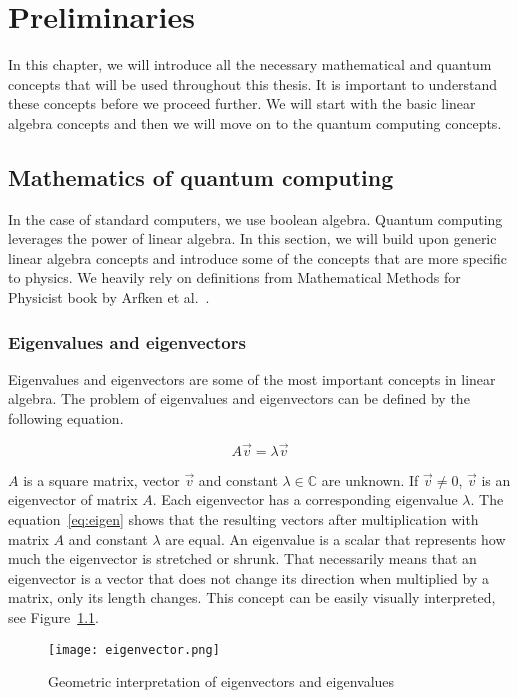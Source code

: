 \graphicspath{ {../images/}}

\chapter{Preliminaries}\label{ch:preliminaries}
In this chapter, we will introduce all the necessary mathematical and quantum concepts that will be used throughout this thesis. It is important to understand these concepts before we proceed further. We will start with the basic linear algebra concepts and then we will move on to the quantum computing concepts.
\section{Mathematics of quantum computing}
In the case of standard computers, we use boolean algebra. Quantum computing leverages the power of linear algebra. In this section, we will build upon generic linear algebra concepts and introduce some of the concepts that are more specific to physics. We heavily rely on definitions from Mathematical Methods for Physicist book by Arfken et al.~\cite{mmp}.

\subsection*{Eigenvalues and eigenvectors}
Eigenvalues and eigenvectors are some of the most important concepts in linear algebra. The problem of eigenvalues and eigenvectors can be defined by the following equation. 

\begin{equation}
  A\vec{v} = \lambda \vec{v}
  \label{eq:eigen}
\end{equation}

\noindent $A$ is a square matrix, vector $\vec{v}$ and constant $\lambda \in \mathbb{C}$ are unknown. If $\vec{v} \neq 0$, $\vec{v}$ is an eigenvector of matrix $A$. Each eigenvector has a corresponding eigenvalue $\lambda$. The equation~\ref{eq:eigen} shows that the resulting vectors after multiplication with matrix $A$ and constant $\lambda$ are equal. An eigenvalue is a scalar that represents how much the eigenvector is stretched or shrunk. That necessarily means that an eigenvector is a vector that does not change its direction when multiplied by a matrix, only its length changes. This concept can be easily visually interpreted, see Figure~\ref{fig:eigen}.

\begin{figure}[H]
  \centering
  \texttt{[image: eigenvector.png]}
  \caption{Geometric interpretation of eigenvectors and eigenvalues \cite{img:eigen}}
  \label{fig:eigen}
\end{figure} 


